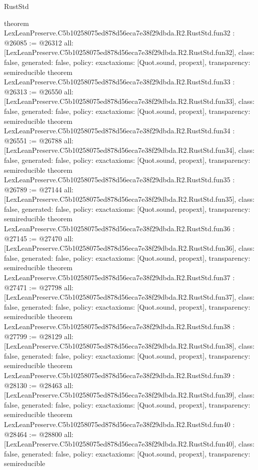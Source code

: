 \begin{lexlean}{RustStd}
\begin{coremodule}
{}
theorem LexLeanPreserve.C5b10258075ed878d56eca7e38f29dbda.R2.RustStd.fun32 : @26085 := @26312 {
  all: [LexLeanPreserve.C5b10258075ed878d56eca7e38f29dbda.R2.RustStd.fun32],
  class: false,
  generated: false,
  policy: exact{axioms: [Quot.sound, propext]},
  transparency: semireducible
}
theorem LexLeanPreserve.C5b10258075ed878d56eca7e38f29dbda.R2.RustStd.fun33 : @26313 := @26550 {
  all: [LexLeanPreserve.C5b10258075ed878d56eca7e38f29dbda.R2.RustStd.fun33],
  class: false,
  generated: false,
  policy: exact{axioms: [Quot.sound, propext]},
  transparency: semireducible
}
theorem LexLeanPreserve.C5b10258075ed878d56eca7e38f29dbda.R2.RustStd.fun34 : @26551 := @26788 {
  all: [LexLeanPreserve.C5b10258075ed878d56eca7e38f29dbda.R2.RustStd.fun34],
  class: false,
  generated: false,
  policy: exact{axioms: [Quot.sound, propext]},
  transparency: semireducible
}
theorem LexLeanPreserve.C5b10258075ed878d56eca7e38f29dbda.R2.RustStd.fun35 : @26789 := @27144 {
  all: [LexLeanPreserve.C5b10258075ed878d56eca7e38f29dbda.R2.RustStd.fun35],
  class: false,
  generated: false,
  policy: exact{axioms: [Quot.sound, propext]},
  transparency: semireducible
}
theorem LexLeanPreserve.C5b10258075ed878d56eca7e38f29dbda.R2.RustStd.fun36 : @27145 := @27470 {
  all: [LexLeanPreserve.C5b10258075ed878d56eca7e38f29dbda.R2.RustStd.fun36],
  class: false,
  generated: false,
  policy: exact{axioms: [Quot.sound, propext]},
  transparency: semireducible
}
theorem LexLeanPreserve.C5b10258075ed878d56eca7e38f29dbda.R2.RustStd.fun37 : @27471 := @27798 {
  all: [LexLeanPreserve.C5b10258075ed878d56eca7e38f29dbda.R2.RustStd.fun37],
  class: false,
  generated: false,
  policy: exact{axioms: [Quot.sound, propext]},
  transparency: semireducible
}
theorem LexLeanPreserve.C5b10258075ed878d56eca7e38f29dbda.R2.RustStd.fun38 : @27799 := @28129 {
  all: [LexLeanPreserve.C5b10258075ed878d56eca7e38f29dbda.R2.RustStd.fun38],
  class: false,
  generated: false,
  policy: exact{axioms: [Quot.sound, propext]},
  transparency: semireducible
}
theorem LexLeanPreserve.C5b10258075ed878d56eca7e38f29dbda.R2.RustStd.fun39 : @28130 := @28463 {
  all: [LexLeanPreserve.C5b10258075ed878d56eca7e38f29dbda.R2.RustStd.fun39],
  class: false,
  generated: false,
  policy: exact{axioms: [Quot.sound, propext]},
  transparency: semireducible
}
theorem LexLeanPreserve.C5b10258075ed878d56eca7e38f29dbda.R2.RustStd.fun40 : @28464 := @28800 {
  all: [LexLeanPreserve.C5b10258075ed878d56eca7e38f29dbda.R2.RustStd.fun40],
  class: false,
  generated: false,
  policy: exact{axioms: [Quot.sound, propext]},
  transparency: semireducible
}
\end{coremodule}
\end{lexlean}
